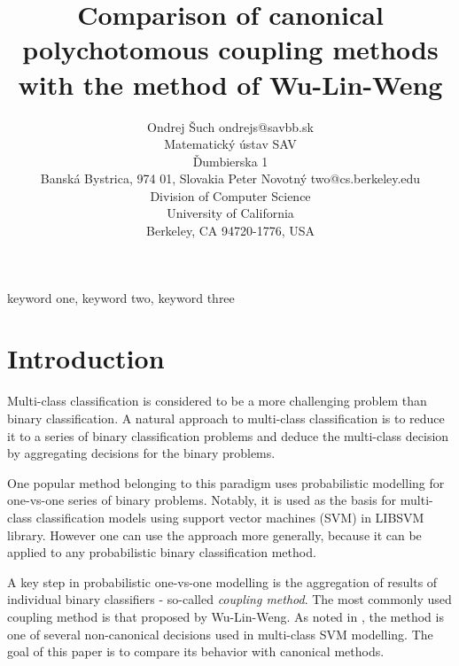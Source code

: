 \documentclass[twoside,11pt]{article}
\begin{document}
\title{Comparison of canonical polychotomous coupling methods with the method of Wu-Lin-Weng}

\author{\name Ondrej Šuch \email ondrejs@savbb.sk \\
       \addr Matematický ústav SAV\\
       Ďumbierska 1\\
       Banská Bystrica, 974 01, Slovakia
       \AND
       \name Peter Novotný \email two@cs.berkeley.edu \\
       \addr Division of Computer Science\\
       University of California\\
       Berkeley, CA 94720-1776, USA}


\maketitle

\begin{abstract}%
\blindtext
\end{abstract}

\begin{keywords}
  keyword one, keyword two, keyword three
\end{keywords}

\section{Introduction}


Multi-class classification is considered to be a more challenging problem than binary classification.  A natural approach to multi-class classification is to reduce it to a series of binary classification problems and deduce the multi-class decision by aggregating decisions for the binary problems. 

One popular method belonging to  this paradigm uses probabilistic modelling for one-vs-one series of binary problems. Notably, it is used as the basis for multi-class classification models using support vector machines (SVM) in LIBSVM library. However one can use the approach more generally,  because it can be applied to any probabilistic binary classification method. 

A key step in probabilistic one-vs-one modelling is the aggregation of results of individual binary classifiers - so-called \emph{coupling method}. The most commonly used coupling method is that proposed by Wu-Lin-Weng. As noted in \cite{dohau}, the method is one of several non-canonical decisions used in multi-class SVM modelling. The goal of this paper is to compare its behavior with canonical methods. 
\end{document}
